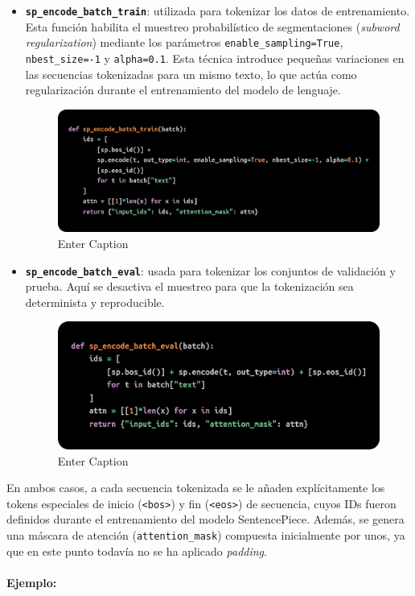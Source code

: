 \documentclass[11pt]{book}
\theoremstyle{plain}
\theoremstyle{definition}
\begin{document}
\begin{itemize}
    \item \textbf{\texttt{sp\_encode\_batch\_train}}: utilizada para tokenizar los datos de entrenamiento. Esta función habilita el muestreo probabilístico de segmentaciones (\textit{subword regularization}) mediante los parámetros \texttt{enable\_sampling=True}, \texttt{nbest\_size=-1} y \texttt{alpha=0.1}. Esta técnica introduce pequeñas variaciones en las secuencias tokenizadas para un mismo texto, lo que actúa como regularización durante el entrenamiento del modelo de lenguaje.
\begin{figure}[h]
    \centering
    \includegraphics[width=0.5\linewidth]{img/train_tok.png}
    \caption{Enter Caption}
    \label{fig:placeholder4}
\end{figure}
    \item \textbf{\texttt{sp\_encode\_batch\_eval}}: usada para tokenizar los conjuntos de validación y prueba. Aquí se desactiva el muestreo para que la tokenización sea determinista y reproducible.

    \begin{figure}[h]
        \centering
        \includegraphics[width=0.5\linewidth]{img/test_tok.png}
        \caption{Enter Caption}
        \label{fig:placeholder5}
    \end{figure}
\end{itemize}

En ambos casos, a cada secuencia tokenizada se le añaden explícitamente los tokens especiales de inicio (\texttt{<bos>}) y fin (\texttt{<eos>}) de secuencia, cuyos IDs fueron definidos durante el entrenamiento del modelo SentencePiece. Además, se genera una máscara de atención (\texttt{attention\_mask}) compuesta inicialmente por unos, ya que en este punto todavía no se ha aplicado \textit{padding}.

\paragraph{Ejemplo:}
\end{document}
